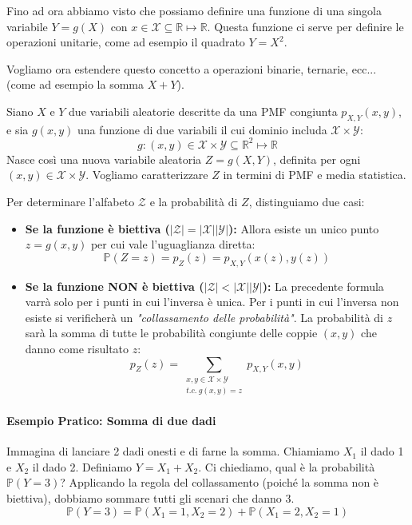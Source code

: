 Fino ad ora abbiamo visto che possiamo definire una funzione di una singola variabile $Y = g(X)$ con $x \in \mathcal{X} \subseteq \mathbb{R} \longmapsto \mathbb{R}$. Questa funzione ci serve per definire le operazioni unitarie, come ad esempio il quadrato $Y = X^2$.

Vogliamo ora estendere questo concetto a operazioni binarie, ternarie, ecc... (come ad esempio la somma $X+Y$).

Siano $X$ e $Y$ due variabili aleatorie descritte da una PMF congiunta $p_{X,Y}(x,y)$, e sia $g(x,y)$ una funzione di due variabili il cui dominio includa $\mathcal{X} \times \mathcal{Y}$:
\[
g: (x,y) \in \mathcal{X} \times \mathcal{Y} \subseteq \mathbb{R}^2 \longmapsto \mathbb{R}
\]
Nasce così una nuova variabile aleatoria $Z = g(X,Y)$, definita per ogni $(x,y) \in \mathcal{X} \times \mathcal{Y}$. Vogliamo caratterizzare $Z$ in termini di PMF e media statistica.

Per determinare l'alfabeto $\mathcal{Z}$ e la probabilità di $Z$, distinguiamo due casi:
\begin{itemize}
    \item \textbf{Se la funzione è biettiva ($|\mathcal{Z}| = |\mathcal{X}||\mathcal{Y}|$):} Allora esiste un unico punto $z = g(x,y)$ per cui vale l'uguaglianza diretta:
    \begin{equation}
        \mathbb{P}(Z=z) = p_Z(z) = p_{X,Y}(x(z), y(z))
    \end{equation}
    
    \item \textbf{Se la funzione NON è biettiva ($|\mathcal{Z}| < |\mathcal{X}||\mathcal{Y}|$):} La precedente formula varrà solo per i punti in cui l'inversa è unica. Per i punti in cui l'inversa non esiste si verificherà un \textit{"collassamento delle probabilità"}. La probabilità di $z$ sarà la somma di tutte le probabilità congiunte delle coppie $(x,y)$ che danno come risultato $z$:
    \begin{equation}
        p_Z(z) = \sum_{\substack{x,y \in \mathcal{X} \times \mathcal{Y} \\ t.c. \ g(x,y)=z}} p_{X,Y}(x,y)
    \end{equation}
\end{itemize}

\paragraph{Esempio Pratico: Somma di due dadi}
Immagina di lanciare 2 dadi onesti e di farne la somma. Chiamiamo $X_1$ il dado 1 e $X_2$ il dado 2. 
Definiamo $Y = X_1 + X_2$. Ci chiediamo, qual è la probabilità $\mathbb{P}(Y=3)$? 
Applicando la regola del collassamento (poiché la somma non è biettiva), dobbiamo sommare tutti gli scenari che danno 3.
\[
\mathbb{P}(Y=3) = \mathbb{P}(X_1=1, X_2=2) + \mathbb{P}(X_1=2, X_2=1)
\]

